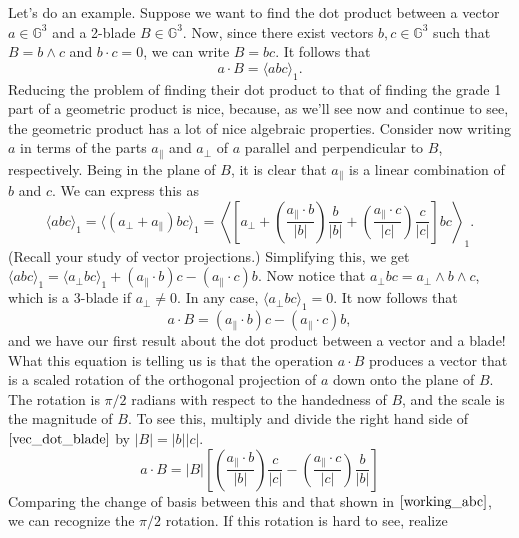 \documentclass{article}
\newcommand{\G}{\mathbb{G}}
\newcommand{\prl}{\parallel}
\newcommand{\prp}{\perp}
\begin{document}
Let's do an example.  Suppose we want to find the dot product
between a vector $a\in\G^3$ and a 2-blade $B\in\G^3$.  Now, since
there exist vectors $b,c\in\G^3$ such that $B=b\wedge c$ and
$b\cdot c=0$, we can write $B=bc$.  It follows that
\begin{equation*}
a\cdot B = \langle abc\rangle_1.
\end{equation*}
Reducing the problem of finding their dot product to that of finding
the grade 1 part of a geometric product is nice, because, as we'll
see now and continue to see, the geometric product has a lot of nice
algebraic properties.  Consider now writing $a$ in terms of the
parts $a_{\prl}$ and $a_{\prp}$ of $a$ parallel and perpendicular to $B$, respectively.
Being in the plane of $B$, it is clear that $a_{\prl}$ is a linear combination of $b$ and $c$.
We can express this as
\begin{equation}\label{working_abc}
\langle abc\rangle_1 = \langle (a_{\prp}+a_{\prl})bc\rangle_1 =
\left\langle\left[a_\prp+\left(\frac{a_{\prl}\cdot b}{|b|}\right)\frac{b}{|b|}+
\left(\frac{a_{\prl}\cdot c}{|c|}\right)\frac{c}{|c|}\right]bc\right\rangle_1.
\end{equation}
(Recall your study of vector projections.)
Simplifying this, we get
$\langle abc\rangle_1 = \langle a_{\prp}bc\rangle_1 + (a_{\prl}\cdot b)c - (a_{\prl}\cdot c)b$.
Now notice that $a_{\prp}bc=a_{\prp}\wedge b\wedge c$, which is a 3-blade if $a_{\prp}\neq 0$.
In any case, $\langle a_{\prp}bc\rangle_1=0$.
It now follows that
\begin{equation}\label{vec_dot_blade}
a\cdot B = (a_{\prl}\cdot b)c - (a_{\prl}\cdot c)b,
\end{equation}
and we have our first result about the dot product between a vector and a blade!
What this equation is telling us is that the operation $a\cdot B$ produces a
vector that is a scaled rotation of the orthogonal projection of $a$ down onto the plane of $B$.
The rotation is $\pi/2$ radians with respect to the handedness of $B$, and
the scale is the magnitude of $B$.  To see this, multiply and divide the right
hand side of $\eqref{vec_dot_blade}$ by $|B|=|b||c|$.
\begin{equation*}
a\cdot B = |B|\left[\left(\frac{a_{\prl}\cdot b}{|b|}\right)\frac{c}{|c|} -
\left(\frac{a_{\prl}\cdot c}{|c|}\right)\frac{b}{|b|}\right]
\end{equation*}
Comparing the change of basis between this and that shown in $\eqref{working_abc}$,
we can recognize the $\pi/2$ rotation.  If this rotation is hard to see, realize
\end{document}
